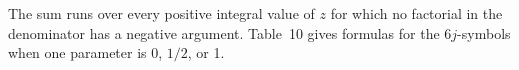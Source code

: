 The sum runs over every positive integral value of $z$ for which no factorial in the denominator has a negative argument. Table~10 gives formulas for the $6j$-symbols when one parameter is 0, $1/2$, or 1.
